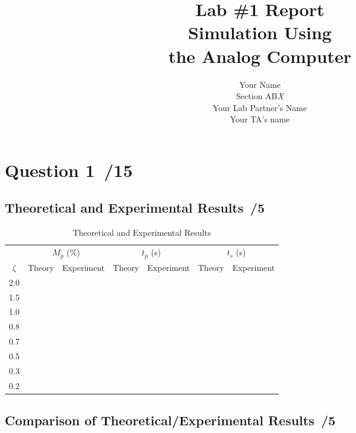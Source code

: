\documentclass{article}
\newcommand{\score}{\hfill \underline{\hspace{0.65cm}}\,/} %
\begin{document}
\title{\bf Lab \#1 Report\\{\sc Simulation Using \\the Analog Computer}}
\author{Your Name\\ Section AB\emph{X}\\
  Your Lab Partner's Name\\
  Your TA's name}
\maketitle
\noindent {}
\section*{Question 1 \score 15}
\subsection*{Theoretical and Experimental Results \score 5}
\begin{table}[phtb] \label{tbl:lab1_q1}
  \begin{center}
    \caption{Theoretical and Experimental Results}
    \begin{tabular}{c|rr|rr|rr} \hline \hline
      & \multicolumn{2}{c}{$M_p$ (\%)} & \multicolumn{2}{c}{$t_p$ (s)} & \multicolumn{2}{c}{$t_s$ (s)} \\ \cline{2-7} %
      $\zeta$ & Theory & Experiment & Theory & Experiment & Theory & Experiment \\
      \hline
      2.0 & &&&&&\\ 
      1.5 & &&&&&\\
      1.0 & &&&&&\\
      0.8 & &&&&&\\
      0.7 & &&&&&\\
      0.5 & &&&&&\\
      0.3 & &&&&&\\
      0.2 & &&&&& \\ \hline 
    \end{tabular} 
    \end{center}
\end{table}
\subsection*{Comparison of Theoretical/Experimental Results \score 5}
\end{document}

